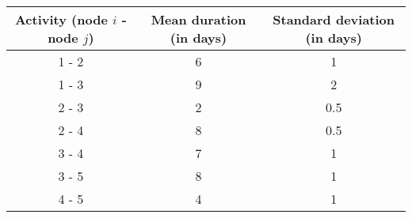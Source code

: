 \begin{tabular}{c c c}
\hline 
Activity (node $i$ \-- node $j$) & Mean duration (in days) & Standard deviation (in days) \\ \hline
1 \-- 2 & 6 & 1 \\ \hline
1 \-- 3 & 9 & 2 \\ \hline
2 \-- 3 & 2 & 0.5 \\ \hline
2 \-- 4 & 8 & 0.5 \\ \hline
3 \-- 4 & 7 & 1 \\ \hline
3 \-- 5 & 8 & 1 \\ \hline
4 \-- 5 & 4 & 1 \\ \hline
\end{tabular}